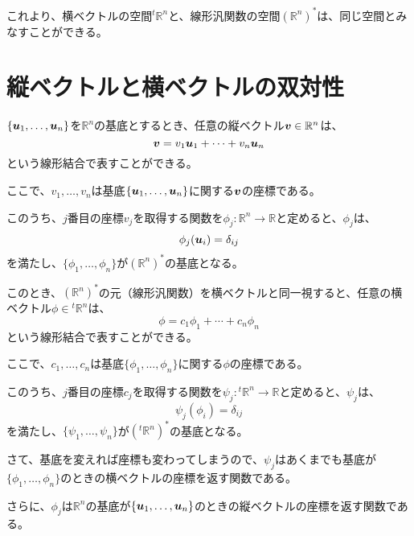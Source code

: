 \documentclass[../../../topic_linear-algebra]{subfiles}
\begin{document}
これより、横ベクトルの空間${}^t \mathbb{R}^n$と、線形汎関数の空間$(\mathbb{R}^n)^*$は、同じ空間とみなすことができる。

\sectionline
\section{縦ベクトルと横ベクトルの双対性}

$\{ \vb*{u}_1, \ldots, \vb*{u}_n \}$を$\mathbb{R}^n$の基底とするとき、任意の縦ベクトル$\vb*{v} \in \mathbb{R}^n$は、
\begin{equation*}
  \vb*{v} = v_1 \vb*{u}_1 + \cdots + v_n \vb*{u}_n
\end{equation*}
という線形結合で表すことができる。

\br

ここで、$v_1, \ldots, v_n$は基底$\{ \vb*{u}_1, \ldots, \vb*{u}_n \}$に関する$\vb*{v}$の座標である。

このうち、$j$番目の座標$v_j$を取得する関数を$\phi_j\colon\mathbb{R}^n \to \mathbb{R}$と定めると、$\phi_j$は、
\begin{equation*}
  \phi_j(\vb*{u}_i) = \delta_{ij}
\end{equation*}
を満たし、$\{ \phi_1, \ldots, \phi_n \}$が$(\mathbb{R}^n)^*$の基底となる。

\br

このとき、$(\mathbb{R}^n)^*$の元（線形汎関数）を横ベクトルと同一視すると、任意の横ベクトル$\phi \in {}^t\mathbb{R}^n$は、
\begin{equation*}
  \phi = c_1 \phi_1 + \cdots + c_n \phi_n
\end{equation*}
という線形結合で表すことができる。

\br

ここで、$c_1, \ldots, c_n$は基底$\{ \phi_1, \ldots, \phi_n \}$に関する$\phi$の座標である。

このうち、$j$番目の座標$c_j$を取得する関数を$\psi_j\colon {}^t\mathbb{R}^n \to \mathbb{R}$と定めると、$\psi_j$は、
\begin{equation*}
  \psi_j(\phi_i) = \delta_{ij}
\end{equation*}
を満たし、$\{ \psi_1, \ldots, \psi_n \}$が$({}^t\mathbb{R}^n)^*$の基底となる。

\br

さて、基底を変えれば座標も変わってしまうので、$\psi_j$はあくまでも基底が$\{ \phi_1, \ldots, \phi_n \}$のときの横ベクトルの座標を返す関数である。

さらに、$\phi_j$は$\mathbb{R}^n$の基底が$\{ \vb*{u}_1, \ldots, \vb*{u}_n \}$のときの縦ベクトルの座標を返す関数である。
\end{document}
